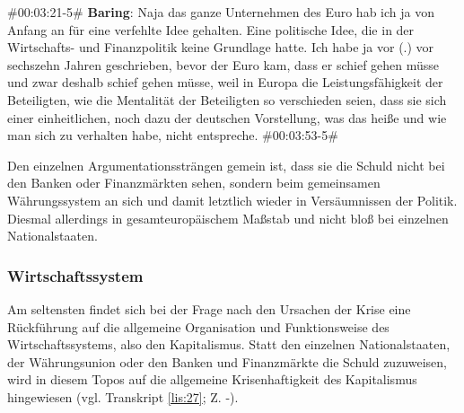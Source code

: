\begin{description}
	\begin{linenumbers}[1]
		\item \#00:03:21-5\# \textbf{Baring}: Naja das ganze Unternehmen des Euro hab ich ja von Anfang an für eine verfehlte Idee gehalten. Eine politische Idee, die in der Wirtschafts- und Finanzpolitik keine Grundlage hatte. Ich habe ja vor (.) vor sechszehn Jahren geschrieben, bevor der Euro kam, dass er schief gehen müsse und zwar deshalb schief gehen müsse, weil in Europa die Leistungsfähigkeit der Beteiligten, wie die Mentalität der Beteiligten so verschieden seien, dass sie sich einer einheitlichen, noch dazu der deutschen Vorstellung, was das heiße und wie man sich zu verhalten habe, nicht entspreche. \#00:03:53-5\#
	\end{linenumbers}
	\label{lis:26}
\end{description}

Den einzelnen Argumentationssträngen gemein ist, dass sie die Schuld nicht bei den Banken oder Finanzmärkten sehen, sondern beim gemeinsamen Währungssystem an sich und damit letztlich wieder in Versäumnissen der Politik. Diesmal allerdings in gesamteuropäischem Maßstab und nicht bloß bei einzelnen Nationalstaaten.

\subsubsection{Wirtschaftssystem}

Am seltensten findet sich bei der Frage nach den Ursachen der Krise eine Rückführung auf die allgemeine Organisation und Funktionsweise des Wirtschaftssystems, also den Kapitalismus. Statt den einzelnen Nationalstaaten, der Währungsunion oder den Banken und Finanzmärkte die Schuld zuzuweisen, wird in diesem Topos auf die allgemeine Krisenhaftigkeit des Kapitalismus hingewiesen (vgl. Transkript \vref{lis:27}; Z. -).

